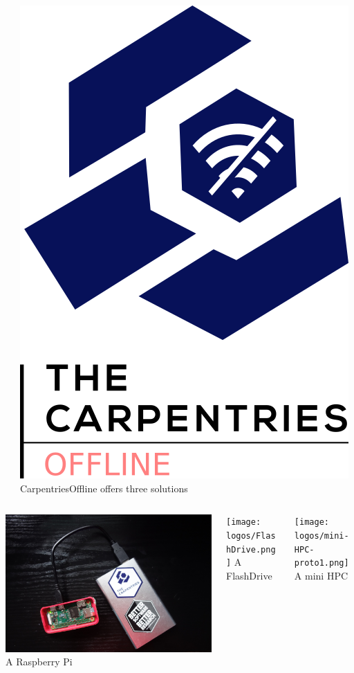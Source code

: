 \documentclass{beamer}
\begin{document}
\begin{frame}
\begin{columns}
\begin{column}{.4\textwidth}
			\end{column}
			\begin{column}{.4\textwidth}
				\centering
				\includegraphics[width=.4\columnwidth]{logos/OFFLINE_long.png}
				CarpentriesOffline offers three solutions
			\end{column}
			\end {columns}
			\begin{columns}
				\begin{column}{.33\textwidth}
					\centering
					\includegraphics[width=\columnwidth]{logos/CarpentriesOfflinePhoto.png}
					A Raspberry Pi
					
				\end{column}
				\begin{column}{.33\textwidth}
					\centering
					\texttt{[image: logos/FlashDrive.png]}
					A FlashDrive
					
				\end{column}
				\begin{column}{.33\textwidth}
					\centering
					\texttt{[image: logos/mini-HPC-proto1.png]}
					A mini HPC
					
				\end{column}
			\end{columns}
			
			
		\end{frame}
	
\end{document}
